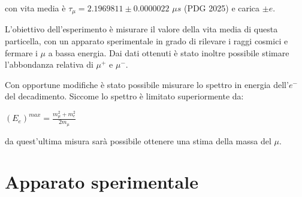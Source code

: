 \documentclass[10pt,a4paper]{article}
\begin{document}
\begin{center}
\end{center}

con vita media è $\tau_{\mu} = 2.1969811 \pm 0.0000022 $ $\mu s$ (PDG 2025) e carica $\pm e$.

L'obiettivo dell'esperimento è misurare il valore della vita media  di questa particella, con un apparato sperimentale in grado di rilevare i raggi cosmici e fermare i $\mu$ a bassa energia. Dai dati ottenuti è stato inoltre possibile stimare l'abbondanza relativa di $\mu^{+}$ e $\mu^{-}$. 

Con opportune modifiche è stato possibile misurare lo spettro in energia dell'$e^{-}$ del decadimento. Siccome lo spettro è limitato superiormente da:
\begin{center}
    $(E_e)^{max} = \frac{m_{\mu}^2+m_{e}^2}{2m_{\mu}}$
\end{center}
da quest'ultima misura sarà possibile ottenere una stima della massa del $\mu$.

\section{Apparato sperimentale}
\end{document}
